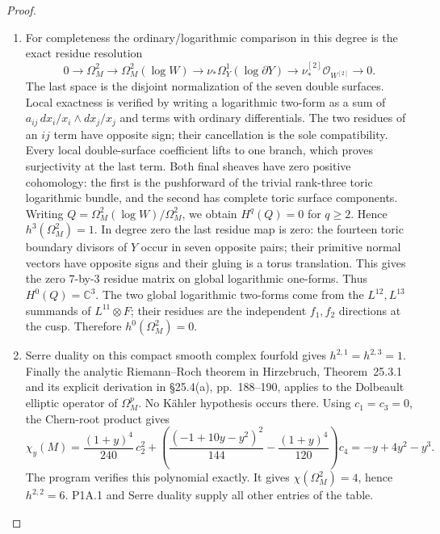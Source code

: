 \documentclass[11pt,a4paper]{article}
\theoremstyle{definition}
\begin{document}
\begin{proof}
\begin{enumerate}[label=\arabic*.]
\item For completeness the ordinary/logarithmic comparison in this
degree is the exact residue resolution
\[
0\to\Omega_M^2\to\Omega_M^2(\log W)
 \to\nu_*\Omega_Y^1(\log\partial Y)
 \to\nu^{[2]}_*\mathcal O_{W^{[2]}}\to0.
\]
The last space is the disjoint normalization of the seven
double surfaces. Local exactness is verified by writing a
logarithmic two-form as a sum of
$a_{ij}\,dx_i/x_i\wedge dx_j/x_j$ and terms with ordinary
differentials. The two residues of an $ij$ term have opposite
sign; their cancellation is the sole compatibility. Every local
double-surface coefficient lifts to one branch, which proves
surjectivity at the last term.
Both final sheaves have zero positive cohomology: the first
is the pushforward of the trivial rank-three toric logarithmic
bundle, and the second has complete toric surface components.
Writing $Q=\Omega_M^2(\log W)/\Omega_M^2$, we obtain
$H^q(Q)=0$ for $q\ge2$. Hence
$h^3(\Omega_M^2)=1$.
In degree zero the last residue map is zero: the fourteen toric
boundary divisors of $Y$ occur in seven opposite pairs; their
primitive normal vectors have opposite signs and their gluing
is a torus translation. This gives the zero $7$-by-$3$ residue
matrix on global logarithmic one-forms. Thus $H^0(Q)=\mathbb C^3$.
The two global logarithmic two-forms come from the
$L^{12},L^{13}$ summands of $L^{11}\otimes F$; their residues
are the independent $f_1,f_2$ directions at the cusp.
Therefore $h^0(\Omega_M^2)=0$.

\item Serre duality on this compact smooth complex fourfold gives
$h^{2,1}=h^{2,3}=1$. Finally the analytic Riemann--Roch theorem
in Hirzebruch, Theorem~25.3.1 and its explicit derivation
in \S25.4(a), pp.~188--190, applies to the Dolbeault elliptic
operator of $\Omega_M^p$. No Kähler hypothesis occurs there.
Using $c_1=c_3=0$, the Chern-root product gives
\[
\chi_y(M)=
\frac{(1+y)^4}{240}\,c_2^2+
\left(\frac{(-1+10y-y^2)^2}{144}
       -\frac{(1+y)^4}{120}\right)c_4
=-y+4y^2-y^3.
\]
The program verifies this polynomial exactly. It gives
$\chi(\Omega_M^2)=4$, hence $h^{2,2}=6$.
P1A.1 and Serre duality supply all other entries of the table.

\end{enumerate}
\end{proof}
\end{document}
